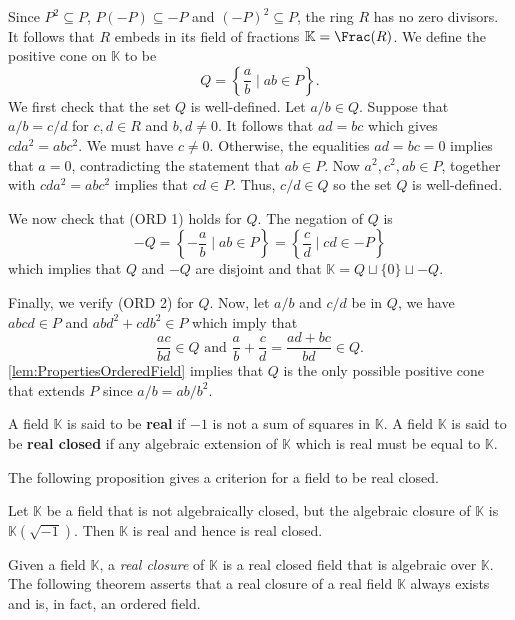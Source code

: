 \documentclass{amsart}
\makeatletter
\renewenvironment{proof}[1][\proofname]{%
   \par\pushQED{\qed}\normalfont%
   \topsep6\p@\@plus6\p@\relax
   \trivlist\item[\hskip\labelsep\bfseries#1\@addpunct{.}]%
   \ignorespaces
}{%
   \popQED\endtrivlist\@endpefalse
}
\makeatother
\begin{document}
\begin{proof}
    Since $P^2 \subseteq P$, $P(-P) \subseteq -P$ and $(-P)^2 \subseteq P$, the ring $R$ has no zero divisors. It follows that $R$ embeds in its field of fractions $\mathbb{K} = \Frac(R)$. We define the positive cone on $\mathbb{K}$ to be
    \[
    Q = \left\{ \frac{a}{b} \mid ab \in P \right\}.
    \]
    We first check that the set $Q$ is well-defined. Let $a/b\in Q$. Suppose that $a/b = c/d $ for $c,d \in R$ and $b,d \neq 0$. It follows that $ad = bc$ which gives $cd a^2 = ab c^2$. We must have $c\neq 0$. Otherwise, the equalities $ad = bc = 0$ implies that $a =0$, contradicting the statement that $ab \in P$. Now $a^2,c^2,ab \in P$, together with $cd a^2 = ab c^2$ implies that $cd \in P$. Thus, $c/d \in Q$ so the set $Q$ is well-defined.
    
    We now check that (ORD 1) holds for $Q$. The negation of $Q$ is
    \[
        -Q = \left\{-\frac{a}{b} \mid ab \in P \right\} = \left\{\frac{c}{d} \mid cd \in -P \right\}
    \]
    which implies that $Q$ and $-Q$ are disjoint and that $\mathbb{K} = Q \sqcup \{0\} \sqcup -Q$. 
    
    Finally, we verify (ORD 2) for $Q$. Now, let $a/b$ and $c/d$ be in $Q$, we have $abcd \in P$ and $abd^2 +cdb^2 \in P$ which imply that 
    \[
    \frac{ac}{bd} \in Q \text{ and } \frac{a}{b} + \frac{c}{d} = \frac{ad + bc}{bd} \in Q.
    \]
    \cref{lem:PropertiesOrderedField} implies that $Q$ is the only possible positive cone that extends $P$ since $a/b = ab/b^2$. 
\end{proof}

\begin{defi}\label{defi:RealField}
 A field $\mathbb{K}$ is said to be \textbf{real} if $-1$ is not a sum of squares in $\mathbb{K}$. A field $\mathbb{K}$ is said to be \textbf{real closed} if any algebraic extension of $\mathbb{K}$ which is real must be equal to $\mathbb{K}$.  
\end{defi}

The following proposition gives a criterion for a field to be real closed.

\begin{prop}
    \label{prop:CriterionToBeRealClosed}
    {\cite[\S 2, Proposition 2.4]{LangAlgebra}}
    Let $\mathbb{K}$ be a field that is not algebraically closed, but the algebraic closure of $\mathbb{K}$ is $\mathbb{K}(\sqrt{-1})$. Then $\mathbb{K}$ is real and hence is real closed.
\end{prop}

Given a field $\mathbb{K}$, a \emph{real closure} of $\mathbb{K}$ is a real closed field that is algebraic over $\mathbb{K}$. The following theorem asserts that a real closure of a real field $\mathbb{K}$ always exists and is, in fact, an ordered field. 
\end{document}
